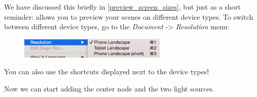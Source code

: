 \begin{details}[frametitle={Previewing a scene on different device types}]
We have discussed this briefly in \ref{preview_screen_sizes}, but just as a
short reminder: \SB{} allows you to preview your scenes on different device
types. To switch between different device types, go to the \textit{Document} ->
\textit{Resolution} menu:
\begin{figure}[H]
  \centering
  \includegraphics[width=200pt]{images/Chapter9/select_resolution.png}
\end{figure}
You can also use the shortcuts displayed next to the device types!
\end{details}
Now we can start adding the center node and the two light sources.

